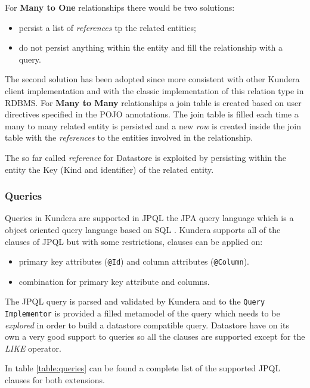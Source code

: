 \noindent For \textbf{Many to One} relationships there would be two solutions:
\begin{itemize}
\item persist a list of \textit{references} tp the related entities;
\item do not persist anything within the entity and fill the relationship with a query.
\end{itemize}
The second solution has been adopted since more consistent with other Kundera client implementation and with the classic implementation of this relation type in RDBMS.
\noindent For \textbf{Many to Many} relationships a join table is created based on user directives specified in the POJO annotations. The join table is filled each time a many to many related entity is persisted and a new \textit{row} is created inside the join table with the \textit{references} to the entities involved in the relationship.

\noindent The so far called \textit{reference} for Datastore is exploited by persisting within the entity the Key (Kind and identifier) of the related entity.

\subsubsection{Queries}
Queries in Kundera are supported in JPQL the JPA query language which is a  object oriented query language based on SQL \cite{book:projpa2}.
Kundera supports all of the clauses of JPQL but with some restrictions, clauses can be applied on:
\begin{itemize}
\item primary key attributes (\texttt{@Id}) and column attributes (\texttt{@Column}).
\item combination for primary key attribute and columns.
\end{itemize}

\newparagraph The JPQL query is parsed and validated by Kundera and to the \texttt{Query Implementor} is provided a filled metamodel of the query which needs to be \textit{explored} in order to build a datastore compatible query.    
Datastore have on its own a very good support to queries so all the clauses are supported except for the \textit{LIKE} operator.

\noindent In table \ref{table:queries} can be found a complete list of the supported JPQL clauses for both extensions.

